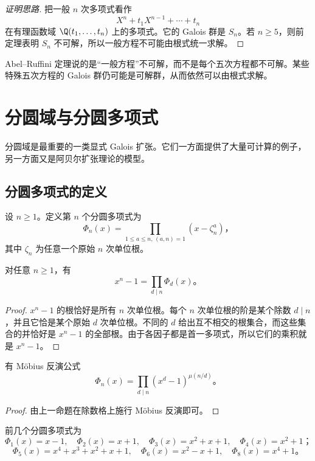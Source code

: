 \begin{proof}[证明思路]
把一般 $n$ 次多项式看作
\[
X^n+t_1X^{n-1}+\cdots+t_n
\]
在有理函数域 $\Q(t_1,\dots,t_n)$ 上的多项式。它的 Galois 群是 $S_n$。若 $n\ge5$，则前定理表明 $S_n$ 不可解，所以一般方程不可能由根式统一求解。
\end{proof}

\begin{remark}
Abel--Ruffini 定理说的是“一般方程”不可解，而不是每个五次方程都不可解。某些特殊五次方程的 Galois 群仍可能是可解群，从而依然可以由根式求解。
\end{remark}

\section{分圆域与分圆多项式}

分圆域是最重要的一类显式 Galois 扩张。它们一方面提供了大量可计算的例子，另一方面又是阿贝尔扩张理论的模型。

\subsection*{分圆多项式的定义}

\begin{definition}
设 $n\ge1$。定义第 $n$ 个分圆多项式为
\[
\Phi_n(x)=\prod_{1\le a\le n,\,(a,n)=1}(x-\zeta_n^a)，
\]
其中 $\zeta_n$ 为任意一个原始 $n$ 次单位根。
\end{definition}

\begin{proposition}
对任意 $n\ge1$，有
\[
x^n-1=\prod_{d\mid n}\Phi_d(x)。
\]
\end{proposition}

\begin{proof}
$ x^n-1 $ 的根恰好是所有 $n$ 次单位根。每个 $n$ 次单位根的阶是某个除数 $d\mid n$，并且它恰是某个原始 $d$ 次单位根。不同的 $d$ 给出互不相交的根集合，而这些集合的并恰好是 $x^n-1$ 的全部根。由于各因子都是首一多项式，所以它们的乘积就是 $x^n-1$。
\end{proof}

\begin{corollary}
有 Möbius 反演公式
\[
\Phi_n(x)=\prod_{d\mid n}(x^d-1)^{\mu(n/d)}。
\]
\end{corollary}

\begin{proof}
由上一命题在除数格上施行 Möbius 反演即可。
\end{proof}

\begin{example}
前几个分圆多项式为
\[
\Phi_1(x)=x-1,
\quad
\Phi_2(x)=x+1,
\quad
\Phi_3(x)=x^2+x+1,
\quad
\Phi_4(x)=x^2+1；
\]
\[
\Phi_5(x)=x^4+x^3+x^2+x+1,
\quad
\Phi_6(x)=x^2-x+1,
\quad
\Phi_8(x)=x^4+1。
\]
\end{example}

